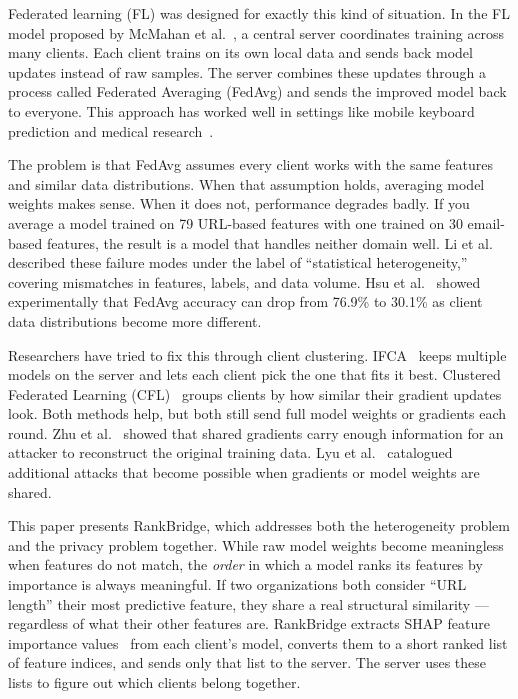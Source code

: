 \documentclass[12pt,a4paper]{article}
\begin{document}
Federated learning (FL) was designed for exactly this kind of situation. In the FL model proposed by McMahan et al.~\cite{mcmahan2017communication}, a central server coordinates training across many clients. Each client trains on its own local data and sends back model updates instead of raw samples. The server combines these updates through a process called Federated Averaging (FedAvg) and sends the improved model back to everyone. This approach has worked well in settings like mobile keyboard prediction and medical research~\cite{bonawitz2019towards,kairouz2021advances}.

The problem is that FedAvg assumes every client works with the same features and similar data distributions. When that assumption holds, averaging model weights makes sense. When it does not, performance degrades badly. If you average a model trained on 79 URL-based features with one trained on 30 email-based features, the result is a model that handles neither domain well. Li et al.~\cite{li2020challenges} described these failure modes under the label of ``statistical heterogeneity,'' covering mismatches in features, labels, and data volume. Hsu et al.~\cite{hsu2019measuring} showed experimentally that FedAvg accuracy can drop from 76.9\% to 30.1\% as client data distributions become more different.

Researchers have tried to fix this through client clustering. IFCA~\cite{ghosh2020ifca} keeps multiple models on the server and lets each client pick the one that fits it best. Clustered Federated Learning (CFL)~\cite{sattler2021cfl} groups clients by how similar their gradient updates look. Both methods help, but both still send full model weights or gradients each round. Zhu et al.~\cite{zhu2019deepleakage} showed that shared gradients carry enough information for an attacker to reconstruct the original training data. Lyu et al.~\cite{lyu2020threats} catalogued additional attacks that become possible when gradients or model weights are shared.

This paper presents RankBridge, which addresses both the heterogeneity problem and the privacy problem together. While raw model weights become meaningless when features do not match, the \textit{order} in which a model ranks its features by importance is always meaningful. If two organizations both consider ``URL length'' their most predictive feature, they share a real structural similarity --- regardless of what their other features are. RankBridge extracts SHAP feature importance values~\cite{lundberg2017shap} from each client's model, converts them to a short ranked list of feature indices, and sends only that list to the server. The server uses these lists to figure out which clients belong together.
\end{document}
